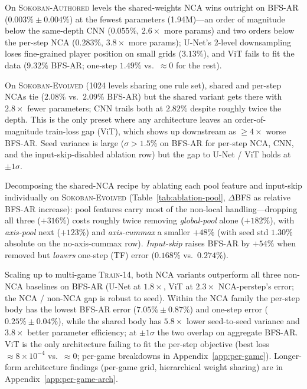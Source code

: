 On \textsc{Sokoban-Authored} levels the shared-weights NCA wins
outright on BFS-AR ($0.003\% \pm 0.004\%$) at the fewest parameters
(1.94M)---an order of magnitude below the same-depth CNN ($0.055\%$,
$2.6\times$ more params) and two orders below the per-step NCA
($0.283\%$, $3.8\times$ more params); U-Net's 2-level downsampling
loses fine-grained player position on small grids ($3.13\%$), and ViT
fails to fit the data ($9.32\%$ BFS-AR; one-step $1.49\%$ vs.\
$\approx 0$ for the rest).

On \textsc{Sokoban-Evolved} (1024 levels sharing one rule set),
shared and per-step NCAs tie ($2.08\%$
vs.\ $2.09\%$ BFS-AR) but the shared variant gets there with
$2.8\times$ fewer parameters; CNN trails both at $2.82\%$ despite
roughly twice the depth.
This is the only preset where any architecture leaves an
order-of-magnitude train-loss gap (ViT), which shows up downstream as
$\geq 4\times$ worse BFS-AR.
Seed variance is large ($\sigma > 1.5\%$ on BFS-AR for per-step NCA,
CNN, and the input-skip-disabled ablation row) but the gap to U-Net /
ViT holds at $\pm 1\sigma$.

\begin{table}[t]
  \centering
  \caption{\textbf{Per-feature ablation of the NCA-shared recipe on
    \textsc{Sokoban-Evolved}.} Mean $\pm$ std over 3
    seeds at 10k updates. $\Delta$BFS reports the absolute increase
    in BFS-AR cell-error vs.\ the full recipe (relative figures in
    parentheses); both error columns are per-cell, averaged across
    rollout steps.}
  \label{tab:ablation-pool}
  \small
  \resizebox{\linewidth}{!}{%
  }
\end{table}

Decomposing the shared-NCA recipe by ablating each pool feature and
input-skip individually on \textsc{Sokoban-Evolved}
(Table~\ref{tab:ablation-pool}, $\Delta$BFS as relative BFS-AR
increase): pool features carry most of the non-local
handling---dropping all three ($+316\%$) costs roughly twice removing
\emph{global-pool} alone ($+182\%$), with \emph{axis-pool} next
($+123\%$) and \emph{axis-cummax} a smaller $+48\%$ (with seed std
$1.30\%$ absolute on the no-axis-cummax row).
\emph{Input-skip} raises BFS-AR by $+54\%$ when removed but
\emph{lowers} one-step (TF) error ($0.168\%$ vs.\ $0.274\%$).

Scaling up to multi-game \textsc{Train-14}, both NCA variants
outperform all three non-NCA baselines on BFS-AR (U-Net at $1.8\times$,
ViT at $2.3\times$ NCA-perstep's error; the NCA / non-NCA gap is
robust to seed).
Within the NCA family the per-step body has the lowest BFS-AR error
($7.05\% \pm 0.87\%$) and one-step error ($0.25\% \pm 0.04\%$), while
the shared body has $5.8\times$ lower seed-to-seed variance and
$3.8\times$ better parameter efficiency; at $\pm 1\sigma$ the two
overlap on aggregate BFS-AR.
ViT is the only architecture failing to fit the per-step objective
(best loss $\approx 8 \times 10^{-4}$ vs.\ $\approx 0$; per-game
breakdowns in Appendix~\ref{app:per-game}).
Longer-form architecture findings (per-game grid, hierarchical weight
sharing) are in Appendix~\ref{app:per-game-arch}.

